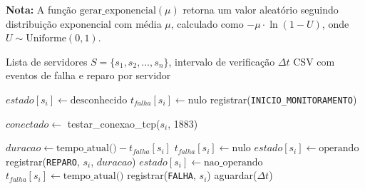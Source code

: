 \vspace{0.3cm}
\noindent
\textbf{Nota:} A fun\c{c}\~{a}o $\text{gerar\_exponencial}(\mu)$ retorna um valor aleat\'{o}rio seguindo distribui\c{c}\~{a}o exponencial com m\'{e}dia $\mu$, calculado como $-\mu \cdot \ln(1 - U)$, onde $U \sim \text{Uniforme}(0,1)$.

\begin{algorithm}[H]
\caption{Monitoramento de Estado do Sistema}
\label{alg:monitoramento}
\begin{algorithmic}[1]
\REQUIRE Lista de servidores $S = \{s_1, s_2, \ldots, s_n\}$, intervalo de verifica\c{c}\~{a}o $\Delta t$
\ENSURE CSV com eventos de falha e reparo por servidor

    \STATE $estado[s_i] \leftarrow \text{desconhecido}$
    \STATE $t_{falha}[s_i] \leftarrow \text{nulo}$
\ENDFOR
\STATE registrar(\texttt{INICIO\_MONITORAMENTO})

        \STATE $conectado \leftarrow$ testar\_conexao\_tcp($s_i$, 1883)

                    \STATE $duracao \leftarrow \text{tempo\_atual()} - t_{falha}[s_i]$
                    \STATE $t_{falha}[s_i] \leftarrow \text{nulo}$
                \ENDIF
                \STATE $estado[s_i] \leftarrow \text{operando}$
                \STATE registrar(\texttt{REPARO}, $s_i$, $duracao$)
            \ENDIF
        \ELSE
                \STATE $estado[s_i] \leftarrow \text{nao\_operando}$
                \STATE $t_{falha}[s_i] \leftarrow \text{tempo\_atual()}$
                \STATE registrar(\texttt{FALHA}, $s_i$)
            \ENDIF
        \ENDIF
    \ENDFOR
    \STATE aguardar($\Delta t$)
\ENDWHILE
\end{algorithmic}
\end{algorithm}

